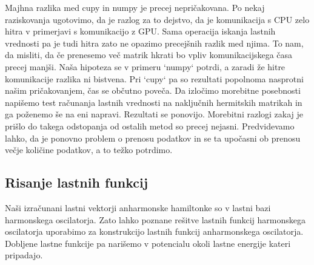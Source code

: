 \documentclass{article}
\begin{document}
Majhna razlika med cupy in numpy je precej nepričakovana. Po nekaj raziskovanja ugotovimo, da je razlog za to dejstvo, da je komunikacija s CPU zelo hitra v primerjavi s komunikacijo z GPU. Sama operacija iskanja lastnih vrednosti pa je tudi hitra zato ne opazimo precejšnih razlik med njima. To nam, da misliti, da če prenesemo več matrik hkrati bo vpliv komunikacijskega časa precej manjši. Naša hipoteza se v primeru `numpy` potrdi, a zaradi že hitre komunikacije razlika ni bistvena. Pri `cupy` pa so rezultati popolnoma nasprotni našim pričakovanjem, čas se občutno poveča. Da izločimo morebitne posebnosti napišemo test računanja lastnih vrednosti na naključnih hermitskih matrikah in ga poženemo še na eni napravi. Rezultati se ponovijo. Morebitni razlogi zakaj je prišlo do takega odstopanja od ostalih metod so precej nejasni. Predvidevamo lahko, da je ponovno problem o prenosu podatkov in se ta upočasni ob prenosu večje količine podatkov, a to težko potrdimo.   

\subsection{Risanje lastnih funkcij}
Naši izračunani lastni vektorji anharmonske hamiltonke so v lastni bazi harmonskega oscilatorja. Zato lahko poznane rešitve lastnih funkcij harmonskega oscilatorja uporabimo za konstrukcijo lastnih funkcij anharmonskega oscilatorja. Dobljene lastne funkcije pa narišemo v potencialu okoli lastne energije kateri pripadajo. 
\end{document}
